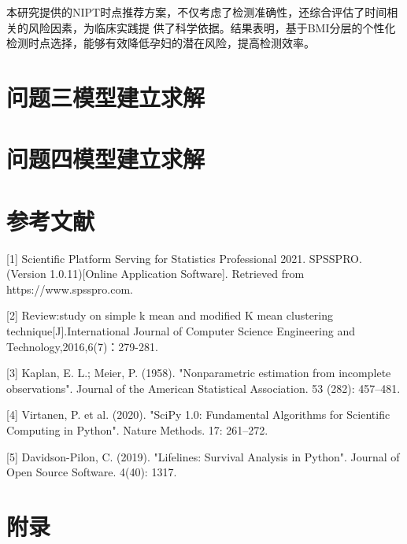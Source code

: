 \documentclass{article}
\begin{document}
本研究提供的NIPT时点推荐方案，不仅考虑了检测准确性，还综合评估了时间相关的风险因素，为临床实践提
供了科学依据。结果表明，基于BMI分层的个性化检测时点选择，能够有效降低孕妇的潜在风险，提高检测效率。
\section{\textbf{问题三模型建立求解}}
\section{\textbf{问题四模型建立求解}}
\section{\textbf{参考文献}}
 [1] Scientific Platform Serving for Statistics Professional 2021. SPSSPRO.
(Version 1.0.11)[Online Application Software]. Retrieved from https://www.spsspro.com.

[2] Review:study on simple k mean and modified K mean clustering
technique[J].International Journal of Computer Science Engineering and Technology,2016,6(7)：279-281.

[3] Kaplan, E. L.; Meier, P. (1958). "Nonparametric estimation from incomplete
observations". Journal of the American Statistical Association. 53 (282): 457–481.

[4] Virtanen, P. et al. (2020). "SciPy 1.0: Fundamental Algorithms for Scientific
Computing in Python". Nature Methods. 17: 261–272.

[5] Davidson-Pilon, C. (2019). "Lifelines: Survival Analysis in Python". Journal
of Open Source Software. 4(40): 1317.
\newpage
\section{\textbf{附录}}
\end{document}
